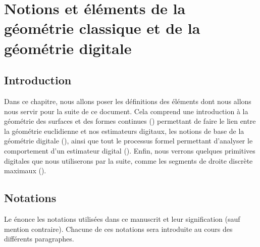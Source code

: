 %
%
%
\chapter{Notions et éléments de la géométrie classique et de la géométrie digitale}
\label{sec:notions}


\setcounter{minitocdepth}{3}
\minitoc

\newpage
%
\section{Introduction}
%
Dans ce chapitre, nous allons poser les définitions des éléments dont nous
allons nous servir pour la suite de ce document. Cela comprend une introduction à
la géométrie des surfaces et des formes continues () permettant
de faire le lien entre la géométrie euclidienne et nos estimateurs digitaux, les
notions de base de la géométrie digitale (), ainsi
que tout le processus formel permettant d'analyser le comportement d'un estimateur
digital (). Enfin, nous verrons
quelques primitives digitales que nous utiliserons par la suite, comme les
segments de droite discrète maximaux ().
%
\section{Notations}
%
Le  énonce les notations utilisées dans ce manuscrit et
leur signification (sauf mention contraire). Chacune de ces notations sera
introduite au cours des différents paragraphes.

